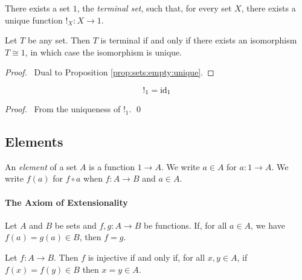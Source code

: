 \begin{ax}
  There exists a set $1$, the \emph{terminal set}, such that, for every set
  $X$, there exists a unique function $!_X : X \rightarrow 1$.
\end{ax}

\begin{prop}
  Let $T$ be any set. Then $T$ is terminal if and only if there exists an isomorphism $T \cong 1$, in which case the isomorphism is unique.
\end{prop}

\begin{proof}
  \pf\ Dual to Proposition \ref{prop:sets:empty:unique}.
\end{proof}

\begin{prop}
  \[ !_1 = \mathrm{id}_{1} \]
\end{prop}

\begin{proof}
  \pf\ From the uniqueness of $!_1$. \qed
\end{proof}

\subsection{Elements}

\begin{df}[Element]
  An \emph{element} of a set $A$ is a function $1 \rightarrow A$. We write $a
  \in A$ for $a : 1 \rightarrow A$. We write $f(a)$ for $f \circ a$ when $f :
  A \rightarrow B$ and $a \in A$.
\end{df}

\paragraph{The Axiom of Extensionality}

\begin{ax}[Extensionality]
 Let $A$ and $B$ be sets and $f, g : A \rightarrow B$ be functions. If, for
all $a \in A$, we have $f(a) = g(a) \in B$, then $f = g$.
\end{ax}

\begin{prop}
  \label{prop:sets:injective:elements}
  Let $f : A \rightarrow B$. Then $f$ is injective if and only if, for all $x, y \in A$, if $f(x) = f(y) \in B$ then $x = y \in A$.
\end{prop}

